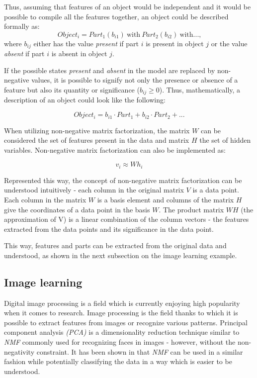 \documentclass[thesis=M,english]{FITthesis}[2012/10/20]
\begin{document}
Thus, assuming that features of an object would be independent and it would be
possible to compile all the features together, an object could be described
formally as:
\begin{equation}
  Object_{i} = Part_{1}(b_{i1})~\text{with}~Part_{2}(b_{i2})~\text{with...,}
\end{equation}
where $b_{ij}$ either has the value \emph{present} if part $i$ is present in object $j$ or
the value \emph{absent} if part $i$ is absent in object $j$.

If the possible states \emph{present} and \emph{absent} in the model are
replaced by non-negative values, it is possible to signify not only the
presence or absence of a feature but also its quantity or significance
($b_{ij} \geq 0$). Thus, mathematically, a description of an object could
look like the following:

\begin{equation}
  Object_{i} = b_{i1} \cdot Part_{1} + b_{i2} \cdot Part_{2} + ...
\end{equation}\cite{nmf-phd-thesis}

When utilizing non-negative matrix factorization, the matrix $W$ can be
considered the set of features present in the data and matrix $H$ the set
of hidden variables. Non-negative matrix factorization can also be implemented
as:

\begin{equation}
  v_{i} \approx Wh_{i}
\end{equation}

Represented this way, the concept of non-negative matrix factorization can
be understood intuitively - each column in the original matrix $V$ is a data point.
Each column in the matrix $W$ is a basis element and columns of the matrix $H$ give the
coordinates of a data point in the basis $W$. The product matrix $WH$ (the approximation
of V) is a linear combination of the column vectors - the features extracted from
the data points and its significance in the data point.

This way, features and parts can be extracted from
the original data and understood, as shown in the next subsection on the
image learning example.


\subsection{Image learning}
Digital image processing is a field which is currently enjoying high
popularity when it comes to research. Image processing is the field thanks
to which it is possible to extract features from images or recognize
various patterns. Principal component analysis \emph{(PCA)} is a dimensionality
reduction technique similar to \emph{NMF} commonly used for recognizing
faces in images \cite{pca-facial} - however, without the non-negativity constraint.
It has been shown in \cite{lee99} that \emph{NMF} can be used in a similar
fashion while potentially classifying the data in a way which is easier to be understood.
\end{document}
